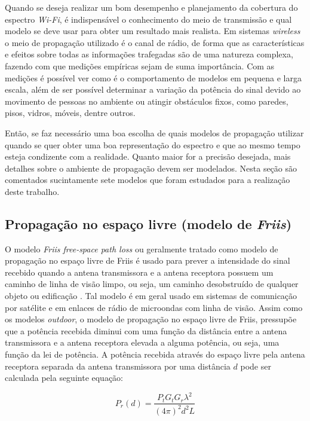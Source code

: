 \documentclass[
	12pt,				%
	twoside,			%
	a4paper,			%
	english,			%
	french,				%
	spanish,			%
	brazil				%
	]{abntex2}
\begin{document}
Quando se deseja realizar um bom desempenho e planejamento da cobertura
do espectro \emph{Wi-Fi}, é indispensável o conhecimento do meio de
transmissão e qual modelo se deve usar para obter um resultado mais
realista. Em sistemas \emph{wireless} o meio de propagação utilizado é o
canal de rádio, de forma que as características e efeitos sobre todas as
informações trafegadas são de uma natureza complexa, fazendo com que
medições empíricas sejam de suma importância. Com as medições é possível
ver como é o comportamento de modelos em pequena e larga escala, além de
ser possível determinar a variação da potência do sinal devido ao
movimento de pessoas no ambiente ou atingir obstáculos fixos, como
paredes, pisos, vidros, móveis, dentre outros.

Então, se faz necessário uma boa escolha de quais modelos de propagação
utilizar quando se quer obter uma boa representação do espectro e que ao
mesmo tempo esteja condizente com a realidade. Quanto maior for a
precisão desejada, mais detalhes sobre o ambiente de propagação devem
ser modelados. Nesta seção são comentados sucintamente sete modelos que
foram estudados para a realização deste trabalho.

\subsection{\texorpdfstring{Propagação no espaço livre (modelo de
\emph{Friis})}{Propagação no espaço livre (modelo de Friis)}}\label{sec:friis}

O modelo \emph{Friis free-space path loss} ou geralmente tratado como
modelo de propagação no espaço livre de Friis é usado para prever a
intensidade do sinal recebido quando a antena transmissora e a antena
receptora possuem um caminho de linha de visão limpo, ou seja, um
caminho desobstruído de qualquer objeto ou edificação \cite{LUO}. Tal
modelo é em geral usado em sistemas de comunicação por satélite e em
enlaces de rádio de microondas com linha de visão. Assim como os modelos
\emph{outdoor}, o modelo de propagação no espaço livre de Friis,
pressupõe que a potência recebida diminui com uma função da distância
entre a antena transmissora e a antena receptora elevada a alguma
potência, ou seja, uma função da lei de potência. A potência recebida
através do espaço livre pela antena receptora separada da antena
transmissora por uma distância \(d\) pode ser calculada pela seguinte
equação:

\begin{equation}
P_{r}(d)= \frac{P_{t}G_{t}G_{r}\lambda^{2}}{(4\pi)^{2}d^{2}L}
\end{equation}
\end{document}
